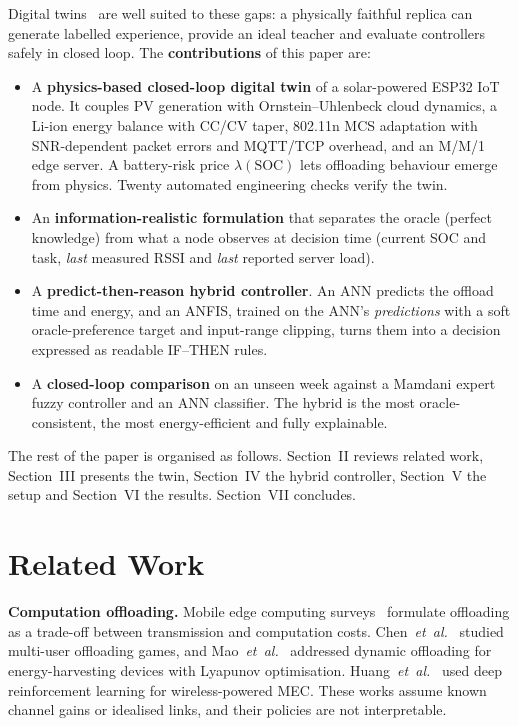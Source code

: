 \documentclass[conference]{IEEEtran}
\begin{document}
Digital twins~\cite{tao2019digital,fuller2020digital} are well suited to these gaps: a physically faithful replica can generate
labelled experience, provide an ideal teacher and evaluate controllers safely in closed loop. The \textbf{contributions} of this
paper are:
\begin{itemize}
  \item A \textbf{physics-based closed-loop digital twin} of a solar-powered ESP32 IoT node. It couples PV generation with
        Ornstein--Uhlenbeck cloud dynamics, a Li-ion energy balance with CC/CV taper, 802.11n MCS adaptation with SNR-dependent
        packet errors and MQTT/TCP overhead, and an M/M/1 edge server. A battery-risk price $\lambda(\mathrm{SOC})$ lets offloading
        behaviour emerge from physics. Twenty automated engineering checks verify the twin.
  \item An \textbf{information-realistic formulation} that separates the oracle (perfect knowledge) from what a node observes at
        decision time (current SOC and task, \emph{last} measured RSSI and \emph{last} reported server load).
  \item A \textbf{predict-then-reason hybrid controller}. An ANN predicts the offload time and energy, and an ANFIS, trained on the
        ANN's \emph{predictions} with a soft oracle-preference target and input-range clipping, turns them into a decision expressed as
        readable IF--THEN rules.
  \item A \textbf{closed-loop comparison} on an unseen week against a Mamdani expert fuzzy controller and an ANN classifier. The
        hybrid is the most oracle-consistent, the most energy-efficient and fully explainable.
\end{itemize}

The rest of the paper is organised as follows. Section~II reviews related work, Section~III presents the twin, Section~IV the
hybrid controller, Section~V the setup and Section~VI the results. Section~VII concludes.

\section{Related Work}
\textbf{Computation offloading.} Mobile edge computing surveys~\cite{mao2017survey,shi2016edge} formulate offloading as a trade-off
between transmission and computation costs. Chen~\emph{et~al.}~\cite{chen2016efficient} studied multi-user offloading games, and
Mao~\emph{et~al.}~\cite{mao2016dynamic} addressed dynamic offloading for energy-harvesting devices with Lyapunov optimisation.
Huang~\emph{et~al.}~\cite{huang2020drl} used deep reinforcement learning for wireless-powered MEC. These works assume known
channel gains or idealised links, and their policies are not interpretable.
\end{document}
